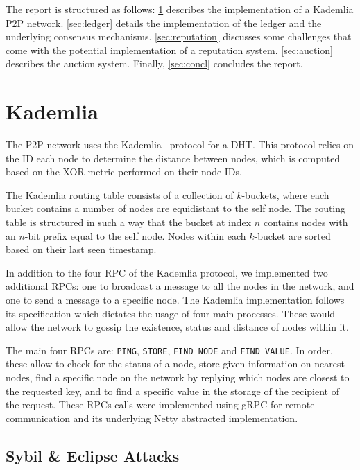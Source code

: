 \documentclass[a4paper, 11pt]{article}
\begin{document}
The report is structured as follows: 
\cref{sec:kademlia} describes the implementation of a Kademlia \acs{P2P} network.
\cref{sec:ledger} details the implementation of the ledger and the underlying consensus mechanisms.
\cref{sec:reputation} discusses some challenges that come with the potential implementation of a reputation system.
\cref{sec:auction} describes the auction system.
Finally, \cref{sec:concl} concludes the report.

\section{Kademlia}\label{sec:kademlia}

The \acs{P2P} network uses the Kademlia~\cite{maymounkov2002kademlia} protocol for a \ac{DHT}.
This protocol relies on the ID each node to determine the distance between nodes, which
is computed based on the XOR metric performed on their node IDs.

The Kademlia routing table consists of a collection of $k$-buckets, where each bucket contains a number of nodes 
are equidistant to the self node. The routing table is structured in such a way that the bucket at index $n$
contains nodes with an $n$-bit prefix equal to the self node. 
Nodes within each $k$-bucket are sorted based on their last seen timestamp.

In addition to the four \acs{RPC} of the Kademlia protocol, we implemented two additional \acsp{RPC}:
one to broadcast a message to all the nodes in the network, and one to send a message to a specific node.
The Kademlia implementation follows its specification which dictates the usage of four main processes.
These would allow the network to gossip the existence, status and distance of nodes within it.

The main four \acsp{RPC} are: \texttt{PING}, \texttt{STORE}, \texttt{FIND\_NODE} and \texttt{FIND\_VALUE}.
In order, these allow to check for the status of a node, store given information on nearest nodes, find a specific node
on the network by replying which nodes are closest to the requested key, and to find a specific value in the storage of
the recipient of the request. These \acsp{RPC} calls were implemented using gRPC for remote communication and its underlying
Netty abstracted implementation.

\subsection{Sybil \& Eclipse Attacks}\label{subsec:sybil-&-eclipse-attacks}
\end{document}
